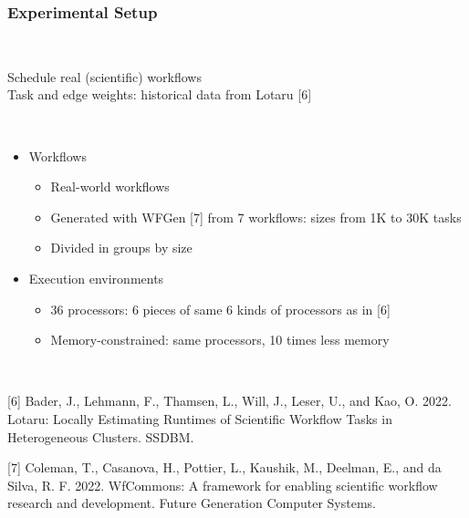\documentclass[xcolor=svgnames,titlepage,english,presentation]{beamer}
\begin{document}
\begin{frame}[t]
    \frametitle{Experimental Setup}

    ~~~~~~~~~~~~~~~~~~~~~~~

    Schedule real (scientific) workflows \\[0.35ex]
    
    Task and edge weights: historical data from Lotaru [6]

    ~~~~~~~~~~~~~~~~~~~

        \begin{itemize}  
        \item Workflows
        \begin{itemize}
             \item Real-world workflows
            \item Generated with WFGen [7] from 7 workflows: sizes from 1K to 30K tasks
            \item Divided in groups by size
        \end{itemize}          
     
        \item Execution environments
         \begin{itemize}
             \item 36 processors: 6 pieces of same 6 kinds of processors as in [6]
            \item Memory-constrained: same processors, 10 times less memory
        \end{itemize} 
    \end{itemize}    

~~~~~~~~~~~~~~~~~~~~~~~~


\footnotesize{[6] Bader, J., Lehmann, F., Thamsen, L., Will, J., Leser, U., and Kao, O. 2022. Lotaru: Locally Estimating Runtimes of Scientific Workflow Tasks in Heterogeneous Clusters. SSDBM.}

\footnotesize{[7] Coleman, T., Casanova, H., Pottier, L., Kaushik, M., Deelman, E., and da Silva, R. F. 2022. WfCommons: A framework for enabling scientific
workflow research and development. Future Generation Computer Systems.}

\end{frame}
\end{document}
